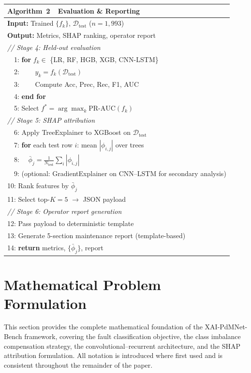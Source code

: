 \documentclass[sensors,article,submit,pdftex,moreauthors]{Definitions/mdpi}
\begin{document}
\begin{table}[H]
\begin{minipage}[t]{0.48\textwidth}
\begin{tabular}{l}
\toprule
\textbf{Algorithm~2}~~Evaluation \& Reporting \\ \midrule
\textbf{Input:} Trained $\{f_k\}$, $\mathcal{D}_\text{test}$ ($n=1{,}993$) \\
\textbf{Output:} Metrics, SHAP ranking, operator report \\[3pt]
\textit{// Stage 4: Held-out evaluation} \\
~~1: \textbf{for} $f_k \in$ \{LR, RF, HGB, XGB, CNN-LSTM\} \\
~~2: ~~~~$\hat{y}_k = f_k(\mathcal{D}_\text{test})$ \\
~~3: ~~~~Compute Acc, Prec, Rec, F1, AUC \\
~~4: \textbf{end for} \\
~~5: Select $f^* = \arg\max_k \text{PR-AUC}(f_k)$ \\[3pt]
\textit{// Stage 5: SHAP attribution} \\
~~6: Apply TreeExplainer to XGBoost on $\mathcal{D}_\text{test}$ \\
~~7: \textbf{for} each test row $i$: mean $|\phi_{i,j}|$ over trees \\
~~8: ~~$\bar{\phi}_j = \frac{1}{N_\text{test}}\sum_i |\phi_{i,j}|$ \\
~~9: (optional: GradientExplainer on CNN--LSTM for secondary analysis) \\
10: Rank features by $\bar{\phi}_j$ \\
11: Select top-$K=5$ $\to$ JSON payload \\[3pt]
\textit{// Stage 6: Operator report generation} \\
12: Pass payload to deterministic template \\
13: Generate 5-section maintenance report (template-based) \\
14: \textbf{return} metrics, $\{\bar{\phi}_j\}$, report \\
\bottomrule
\end{tabular}
\end{minipage}
\end{table}

\section{Mathematical Problem Formulation}
\label{sec:math}

This section provides the complete mathematical foundation of the
XAI-PdMNet-Bench framework, covering the fault classification
objective, the class imbalance compensation strategy, the
convolutional--recurrent architecture, and the SHAP attribution
formulation.
All notation is introduced where first used and is consistent
throughout the remainder of the paper.
\end{document}
